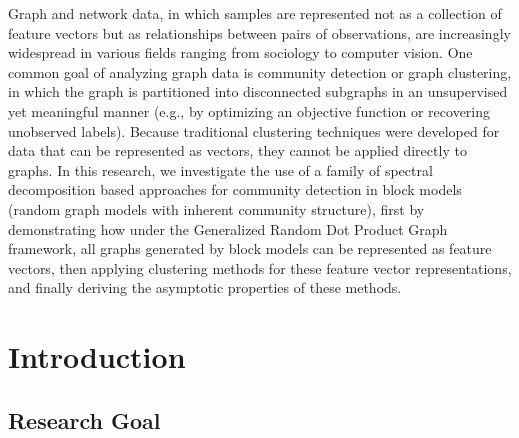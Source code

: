 \documentclass[
  11pt,
]{article}
\begin{document}
Graph and network data, in which samples are represented not as a collection of feature vectors but as relationships between pairs of observations, are increasingly widespread in various fields ranging from sociology to computer vision. One common goal of analyzing graph data is community detection or graph clustering, in which the graph is partitioned into disconnected subgraphs in an unsupervised yet meaningful manner (e.g., by optimizing an objective function or recovering unobserved labels). Because traditional clustering techniques were developed for data that can be represented as vectors, they cannot be applied directly to graphs. In this research, we investigate the use of a family of spectral decomposition based approaches for community detection in block models (random graph models with inherent community structure), first by demonstrating how under the Generalized Random Dot Product Graph framework, all graphs generated by block models can be represented as feature vectors, then applying clustering methods for these feature vector representations, and finally deriving the asymptotic properties of these methods. 

\newpage
{}
\hypersetup{linkcolor = blue}

\newcommand{\diag}{\text{diag}}
\newcommand{\tr}{\text{Tr}}
\newcommand{\blockdiag}{\text{blockdiag}}
\newcommand{\indep}{\stackrel{\text{ind}}{\sim}}
\newcommand{\iid}{\stackrel{\text{iid}}{\sim}}
\newcommand{\Bernoulli}{\text{Bernoulli}}
\newcommand{\Betadist}{\text{Beta}}
\newcommand{\BG}{\text{BernoulliGraph}}
\newcommand{\Cat}{\text{Categorical}}
\newtheorem{definition}{Definition}
\newtheorem{theorem}{Theorem}
\newtheorem{lemma}{Lemma}
\theoremstyle{remark}
\newtheorem*{remark}{Remark}
\theoremstyle{example}
\newtheorem*{example}{Example}

\hypertarget{introduction}{%
\section{Introduction}\label{introduction}}

\hypertarget{research-goal}{%
\subsection{Research Goal}\label{research-goal}}
\end{document}
